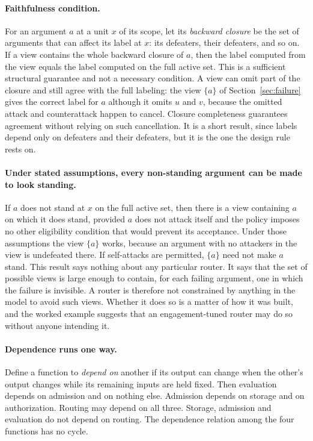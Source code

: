 \documentclass[11pt]{article}
\begin{document}
\paragraph{Faithfulness condition.} For an argument $a$ at a unit $x$ of its scope, let its \emph{backward closure} be the set of arguments that can affect its label at $x$: its defeaters, their defeaters, and so on. If a view contains the whole backward closure of $a$, then the label computed from the view equals the label computed on the full active set. This is a sufficient structural guarantee and not a necessary condition.
A view can omit part of the closure and still agree with the full
labeling: the view $\{a\}$ of Section~\ref{sec:failure} gives the correct
label for $a$ although it omits $u$ and $v$, because the omitted attack
and counterattack happen to cancel. Closure completeness guarantees
agreement without relying on such cancellation. It is a short result,
since labels depend only on defeaters and their defeaters, but it is the
one the design rule rests on.

\paragraph{Under stated assumptions, every non-standing argument can be made to look standing.} If $a$ does not stand at $x$ on the full active set, then there is a view
containing $a$ on which it does stand, provided $a$ does not attack
itself and the policy imposes no other eligibility condition that would
prevent its acceptance. Under those assumptions the view $\{a\}$ works,
because an argument with no attackers in the view is undefeated there.
If self-attacks are permitted, $\{a\}$ need not make $a$ stand. This result says nothing about any particular router. It says that the set of possible views is large enough to contain, for each failing argument, one in which the failure is invisible. A router is therefore not constrained by anything in the model to avoid such views. Whether it does so is a matter of how it was built, and the worked example suggests that an engagement-tuned router may do so without anyone intending it.

\paragraph{Dependence runs one way.} Define a function to \emph{depend on} another if its output can change when the other's output changes while its remaining inputs are held fixed. Then evaluation depends on admission and on nothing else. Admission depends on storage and on authorization. Routing may depend on all three. Storage, admission and evaluation do not depend on routing. The dependence relation among the four functions has no cycle.
\end{document}
